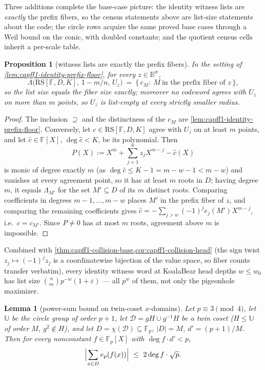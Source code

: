 \documentclass[11pt]{article}
\newtheorem{lemma}[lemma]{Lemma}
\newtheorem{proposition}[proposition]{Proposition}
\theoremstyle{definition}
\theoremstyle{remark}
\newcommand{\F}{\mathbb{F}}
\newcommand{\B}{\mathbb{B}}
\newcommand{\RS}{\mathrm{RS}}
\newcommand{\Lst}{\Lambda}
\newcommand{\UU}{\mathbb{U}}
\begin{document}
Three additions complete the base-case picture: the identity witness lists are \emph{exactly} the prefix fibers, so the census statements above are list-size statements about the code; the circle rows acquire the same proved base cases through a Weil bound on the conic, with doubled constants; and the quotient census cells inherit a per-scale table.

\begin{proposition}[witness lists are exactly the prefix fibers]\label{prop:capff1-witness-exact}
In the setting of \cref{lem:capff1-identity-prefix-floor}, for \emph{every} $z\in\B^w$,
\[
        \Lst\bigl(\RS[\F,D,K],\,1-m/n,\,U_z\bigr)\ =\ \{\,c_M:\ M\ \text{in the prefix fiber of }z\,\},
\]
so the list size equals the fiber size exactly; moreover no codeword agrees with $U_z$ on more than $m$ points, so $U_z$ is list-empty at every strictly smaller radius.
\end{proposition}

\begin{proof}
The inclusion $\supseteq$ and the distinctness of the $c_M$ are \cref{lem:capff1-identity-prefix-floor}.  Conversely, let $c\in\RS[\F,D,K]$ agree with $U_z$ on at least $m$ points, and let $\hat c\in\F[X]$, $\deg\hat c<K$, be its polynomial.  Then
\[
        P(X):=X^m+\sum_{j=1}^{w}z_jX^{m-j}-\hat c(X)
\]
is monic of degree exactly $m$ \textup{(as $\deg\hat c\le K-1=m-w-1<m-w$)} and vanishes at every agreement point, so it has at least $m$ roots in $D$; having degree $m$, it equals $\Lambda_{M'}$ for the set $M'\subseteq D$ of its $m$ distinct roots.  Comparing coefficients in degrees $m-1,\ldots,m-w$ places $M'$ in the prefix fiber of $z$, and comparing the remaining coefficients gives $\hat c=-\sum_{j>w}(-1)^je_j(M')X^{m-j}$, i.e.\ $c=c_{M'}$.  Since $P\ne0$ has at most $m$ roots, agreement above $m$ is impossible.
\end{proof}

Combined with \cref{thm:capff1-collision-base,cor:capff1-collision-head} \textup{(the sign twist $z_j\mapsto(-1)^jz_j$ is a coordinatewise bijection of the value space, so fiber counts transfer verbatim)}, every identity witness word at KoalaBear head depths $w\le w_0$ has list size $\binom nm p^{-w}(1+\varepsilon)$ --- all $p^w$ of them, not only the pigeonhole maximizer.

\begin{lemma}[power-sum bound on twin-coset $x$-domains]\label{lem:capff1-torus-weil}
Let $p\equiv3\pmod4$, let $\UU$ be the circle group of order $p+1$, let $\mathcal D=gH\cup g^{-1}H$ be a twin coset \textup{($H\le\UU$ of order $M$, $g^2\notin H$)}, and let $D=\chi(\mathcal D)\subseteq\F_p$, $|D|=M$, $d'=(p+1)/M$.  Then for every nonconstant $f\in\F_p[X]$ with $\deg f\cdot d'<p$,
\[
        \Bigl|\sum_{x\in D}e_p(f(x))\Bigr|\ \le\ 2\deg f\cdot\sqrt p.
\]
\end{lemma}
\end{document}

